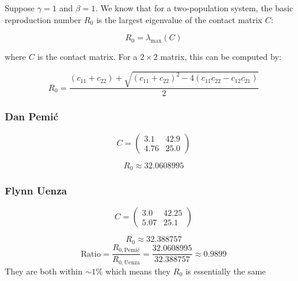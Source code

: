 \documentclass[11pt]{article}
\begin{document}
\begin{enumerate}
\begin{enumerate}[label=\alph*.]
Suppose $\gamma = 1$ and $\beta = 1$.  
We know that for a two-population system, the basic reproduction number $R_0$ is the largest eigenvalue of the contact matrix $C$:

\begin{equation}
    R_0 = \lambda_{\max}(C)
\end{equation}

where $C$ is the contact matrix.  
For a $2 \times 2$ matrix, this can be computed by:

\begin{equation}
    R_0 = \frac{(c_{11} + c_{22}) + \sqrt{(c_{11} + c_{22})^2 - 4(c_{11}c_{22} - c_{12}c_{21})}}{2}
\end{equation}

\subsubsection*{Dan Pemić}

\[
C =
\begin{pmatrix}
3.1 & 42.9 \\
4.76 & 25.0
\end{pmatrix}
\]

\[
R_0 \approx 32.0608995
\]

\subsubsection*{Flynn Uenza}

\[
C =
\begin{pmatrix}
3.0 & 42.25 \\
5.07 & 25.1
\end{pmatrix}
\]

\[
R_0 \approx 32.388757
\]
\[
\text{Ratio} = \frac{R_{0,\text{Pemić}}}{R_{0,\text{Uenza}}} 
= \frac{32.0608995}{32.388757} 
\approx 0.9899
\]
They are both within $\sim1\%$ which means they $R_0$ is essentially the same

\end{enumerate}


\end{enumerate}
\end{document}
